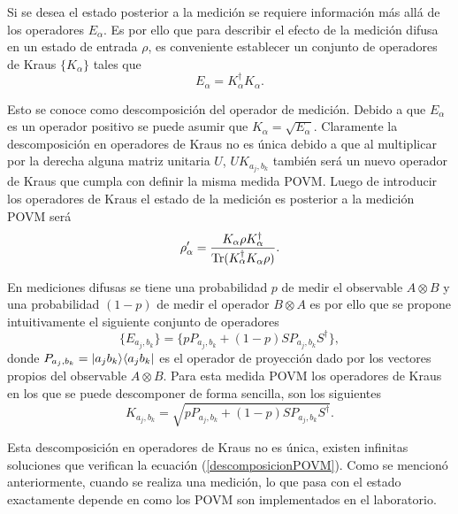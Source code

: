 Si se desea el estado posterior a la medición se requiere información
más allá de los operadores $E_\alpha$. Es por ello que para describir el efecto
de la medición difusa en un estado de entrada $\rho$, es conveniente establecer
un conjunto de operadores de Kraus $\{K_\alpha\}$ tales que
\begin{equation}\label{descomposicionPOVM}E_\alpha=K_\alpha^\dagger K_\alpha.\end{equation}

Esto se conoce como descomposición del operador de medición. Debido a que
$E_\alpha$ es un operador positivo se puede asumir que
$K_\alpha=\sqrt{E_\alpha}$. Claramente la descomposición en operadores de Kraus
no es única debido a que al multiplicar por la derecha alguna matriz unitaria
$U$, $UK_{a_j,b_k}$ también será un nuevo operador de Kraus que cumpla con
definir la misma medida POVM\@. Luego de introducir los operadores de Kraus el
estado de la medición es posterior a la medición POVM será
\begin{equation}\rho'_\alpha=\dfrac{K_\alpha \rho
K_\alpha^\dagger}{{\rm Tr}(K_\alpha^\dagger K_\alpha \rho)}.\end{equation}

 En mediciones difusas se tiene una probabilidad $p$ de medir el observable $A\otimes B$ y una probabilidad $(1-p)$ de medir el operador $B\otimes A$ es por ello que se  propone intuitivamente el siguiente conjunto de
operadores \begin{equation}\{E_{a_j, b_k}\}= \{p
P_{a_j,b_k}+(1-p)SP_{a_j,b_k}S^\dagger\},\end{equation} donde $P_{a_j,b_k} =
|a_j b_k\rangle \langle a_j b_k|$ es el operador de proyección dado por los vectores
propios del observable $A\otimes B$. Para esta medida POVM los operadores de
Kraus en los que se puede descomponer de forma sencilla, son los siguientes
\begin{equation}
K_{a_j, b_k}= \sqrt{p P_{a_j,b_k}+(1-p)SP_{a_j,b_k}S^\dagger}.
\end{equation}

Esta descomposición en operadores de Kraus no es única, existen infinitas soluciones que verifican la ecuación ({\ref{descomposicionPOVM}}).
Como se mencionó anteriormente, cuando se realiza una medición, lo que pasa con
el estado exactamente depende en como los POVM son implementados en el laboratorio.

